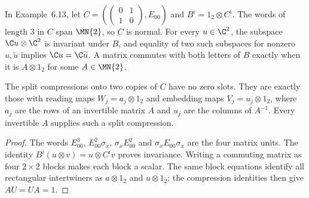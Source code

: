 \begin{lemma}
    \label{lem:asym_example_multiplicity}
    \leanok
    In Example~6.13, let $C=(\left(\begin{smallmatrix}0&1\\1&0\end{smallmatrix}\right),E_{00})$
    and $B^i=1_2\otimes C^i$. The words of length $3$ in $C$ span $\MN{2}$,
    so $C$ is normal. For every $u\in\C^2$, the subspace
    $\C u\otimes\C^2$ is invariant under $B$, and equality of two such
    subspaces for nonzero $u,\widetilde u$ implies
    $\C u=\C\widetilde u$. A matrix commutes with both letters of $B$ exactly
    when it is $A\otimes1_2$ for some $A\in\MN{2}$.

    The split compressions onto two copies of $C$ have no zero slots. They
    are exactly those with reading maps $W_j=a_j\otimes1_2$ and embedding
    maps $V_j=u_j\otimes1_2$, where $a_j$ are the rows of an invertible
    matrix $A$ and $u_j$ are the columns of $A^{-1}$. Every invertible $A$
    supplies such a split compression.
\end{lemma}

\begin{proof}
    \leanok
    The words $E_{00}^3$, $E_{00}^2\sigma_x$,
    $\sigma_xE_{00}^2$ and $\sigma_xE_{00}\sigma_x$ are the four matrix
    units. The identity $B^i(u\otimes v)=u\otimes C^iv$ proves invariance.
    Writing a commuting matrix as four $2\times2$ blocks makes each block a
    scalar. The same block equations identify all rectangular intertwiners
    as $a\otimes1_2$ and $u\otimes1_2$; the compression identities then give
    $AU=UA=1$.
\end{proof}

